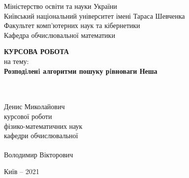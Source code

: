 \documentclass[a4paper]{article}
\begin{document}
\thispagestyle{empty}

\begin{center}
Міністерство освіти та науки України\\
Київський національний університет імені Тараса Шевченка\\
Факультет комп’ютерних наук та кібернетики\\
Кафедра обчислювальної математики\\

\vfill

\huge{\textbf{КУРСОВА РОБОТА}}\\
\large{на тему:}\\
\LARGE{\textbf{Розподiленi алгоритми пошуку рiвноваги Неша}}\\

\end{center}
\vfill

\begin{flushleft}
\quad\quad\quad\quad\quad\quad\quad\quad\quad\quad\quad\quad\quad\quad\quad\quad\quad\quad{}\\
\quad\quad\quad\quad\quad\quad\quad\quad\quad\quad\quad\quad\quad\quad\quad\quad\quad\quad{}\\
\quad\quad\quad\quad\quad\quad\quad\quad\quad\quad\quad\quad\quad\quad\quad\quad\quad\quad{} Денис Миколайович\\
\quad\quad\quad\quad\quad\quad\quad\quad\quad\quad\quad\quad\quad\quad\quad\quad\quad\quad{} курсової роботи\\
\quad\quad\quad\quad\quad\quad\quad\quad\quad\quad\quad\quad\quad\quad\quad\quad\quad\quad{} фізико-математичних наук\\
\quad\quad\quad\quad\quad\quad\quad\quad\quad\quad\quad\quad\quad\quad\quad\quad\quad\quad{} кафедри обчислювальної\\
\quad\quad\quad\quad\quad\quad\quad\quad\quad\quad\quad\quad\quad\quad\quad\quad\quad\quad{}\\
\quad\quad\quad\quad\quad\quad\quad\quad\quad\quad\quad\quad\quad\quad\quad\quad\quad\quad{} Володимир Вікторович\\
\end{flushleft}

\vfill

\centerline{Київ – 2021}
\clearpage

\renewcommand\cftsecdotsep{\cftdot}
\cftsetpnumwidth{9pt}
\tableofcontents
\clearpage
\end{document}

